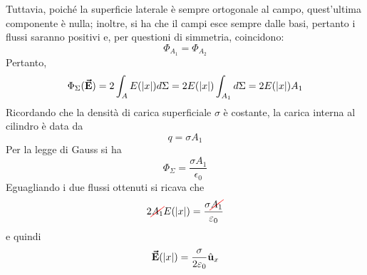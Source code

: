 Tuttavia, poiché la superficie laterale è sempre ortogonale al campo, quest'ultima componente è nulla; inoltre, si ha che il campi esce sempre dalle basi, pertanto i flussi saranno positivi e, per questioni di simmetria, coincidono:
\begin{equation}
	\Phi_{A_1}=\Phi_{A_2}
\end{equation}
Pertanto,
\begin{equation*}
	\Phi_{\Sigma}(\vb*{\va{E}})=2\int_A E(\abs{x})d\Sigma=2 E(\abs{x})\int_{A_1}d\Sigma=2E(\abs{x})A_1
\end{equation*}
Ricordando che la densità di carica superficiale $\sigma$ è costante, la carica interna al cilindro è data da
\begin{equation*}
	q=\sigma A_1
\end{equation*}
Per la legge di Gauss si ha
\begin{equation*}
	\Phi_{\Sigma}=\frac{\sigma A_1}{\epsilon_0}
\end{equation*}
Eguagliando i due flussi ottenuti si ricava che
\begin{equation*}
	2\Ccancel[red]{A_1}E(\abs{x})=\frac{\sigma \Ccancel[red]{A_1}}{\epsilon_0}
\end{equation*}
e quindi
\begin{equation}
	\vb*{\va{E}}(\abs{x})=\frac{\sigma}{2\varepsilon_0}\hat{\mathbf{u}}_x
\end{equation}
